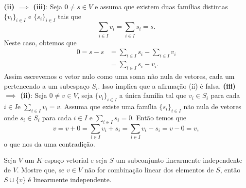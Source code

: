 \documentclass[11pt,a4paper]{article}
\begin{document}
{{                                                             \task[\pers{e}]\textbf{(ii) $\implies$ (iii)}: Seja
                                                      \(0\neq s\in V\) e
          assuma que existem duas famílias distintas \(\{v_i\}_{i\in I}\) e
          \(\{s_i\}_{i\in I}\) tais que \[\sum\limits_{i\in I} v_i=\sum\limits_{i\in
              I}s_i=s.\] Neste caso, obtemos que \begin{align*}
                                                   0=s-s&=\sum\limits_{i\in I}s_i-\sum\limits_{i\in I}v_i\\&=\sum\limits_{i \in I}s_i-v_i.
                                                 \end{align*}
                                                 Assim escrevemos o vetor nulo
                                                 como uma soma não nula de
                                                 vetores, cada um pertencendo a
                                                 um subespaço \(S_i\). Isso
                                                 implica que a afirmação (ii) é falsa.
                                                 \task[\pers{f}]\textbf{(iii)$\implies$ (ii)}:
                       Seja \(0\neq v\in V\), seja \(\{v_i\}_{i\in I}\) a única
                       família tal que \(v_i\in S_i\) para cada \(i\in I\)e
                       \(\sum\limits_{i\in I}v_i=v\). Assuma que existe uma
           família \(\{s_i\}_{i\in I}\) não nula de vetores onde \(s_i\in S_i\)
           para cada \(i\in I\) e \(\sum\limits_{i\in I}s_i=0\). Então temos
           que \[v=v+0=\sum\limits_{i\in I}v_i+s_i=\sum\limits_{i\in I}v_i-s_i=v-0=v,\]
           o que nos da uma contradição.
          
         }}

 Seja  \(V\) um \(K\)-espaço vetorial e seja \(S\) um subconjunto
linearmente independente de \(V\). Mostre que, se \(v\in V\) não for combinação
linear dos elementos de \(S\), então \(S\cup\{v\}\) é linearmente independente.

\end{document}
